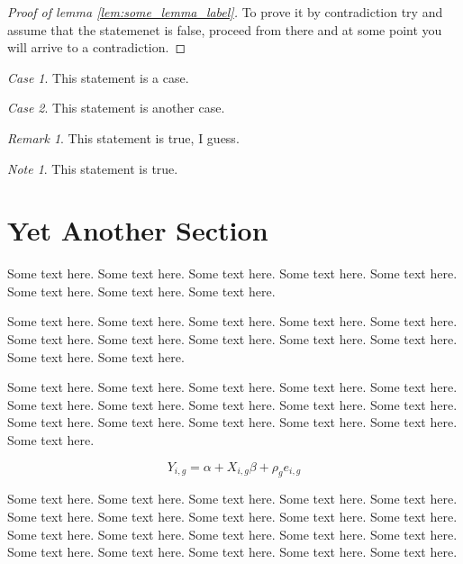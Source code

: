 \documentclass[11pt,twoside]{article}
\theoremstyle{plain}
\theoremstyle{definition}
\theoremstyle{remark}
\newtheorem*{remark}{Remark}
\newtheorem*{note}{Note}
\newtheorem{case}{Case}
\begin{document}
\begin{proof}[Proof of lemma \ref{lem:some_lemma_label}]
To prove it by contradiction try and assume that the statemenet is false,
proceed from there and at some point you will arrive to a contradiction.
\end{proof}


\setcounter{case}{0}
\begin{case}
This statement is a case.
\end{case}

\begin{case}
This statement is another case.
\end{case}

\begin{remark}
This statement is true, I guess.
\end{remark}

\begin{note}
This statement is true.
\end{note}




\section{Yet Another Section} %
\label{sec:yet_another_section}

Some text here. Some text here. Some text here. Some text here.
Some text here. Some text here. Some text here. Some text here.

Some text here. Some text here. Some text here. Some text here.
Some text here. Some text here. Some text here. Some text here.
Some text here. Some text here. Some text here. Some text here.

Some text here. Some text here. Some text here. Some text here.
Some text here. Some text here. Some text here. Some text here.
Some text here. Some text here. Some text here. Some text here.
Some text here. Some text here. Some text here. Some text here.


\begin{equation} \label{equ:regresion}
  Y_{i,g} = \alpha + X_{i,g} \beta + \rho_{g} e_{i,g}
\end{equation}

Some text here. Some text here. Some text here. Some text here.
Some text here. Some text here. Some text here. Some text here.
Some text here. Some text here. Some text here. Some text here.
Some text here. Some text here. Some text here. Some text here.
Some text here. Some text here. Some text here. Some text here.
\end{document}
